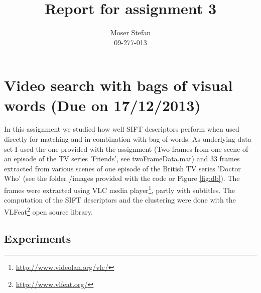 \documentclass{paper}
\title{Report for assignment 3}
\author{Moser Stefan\\09-277-013}
\begin{document}
\maketitle

\section{Video search with bags of visual words (Due on 17/12/2013)}
In this assignment we studied how well SIFT descriptors perform when used directly 
for matching and in combination with bag of words. As underlying data set I used the
one provided with the assignment (Two frames from one scene of an episode of the TV series 'Friends',
see twoFrameData.mat) and 33 frames extracted from various scenes of one episode of the
British TV series 'Doctor Who' (see the folder /images provided with the code or Figure \ref{fig:db}). The
frames were extracted using VLC media player\footnote{\url{http://www.videolan.org/vlc/}},
partly with subtitles.
The computation of the SIFT descriptors and the clustering were done with the VLFeat\footnote{\url{http://www.vlfeat.org/}} open source library.

\subsection{Experiments}
\end{document}
